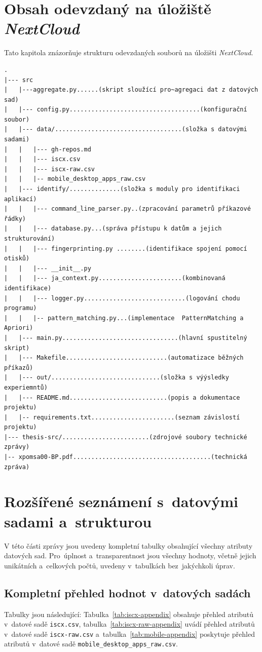 \chapter{Obsah odevzdaný na úložiště \textit{NextCloud}}
\label{chap:appendix-structure}
Tato kapitola znázorňuje strukturu odevzdaných souborů na úložišti \textit{NextCloud}.
\begin{verbatim}
.
|--- src
|   |---aggregate.py......(skript sloužící pro~agregaci dat z datových sad)
|   |--- config.py....................................(konfigurační soubor)
|   |--- data/...................................(složka s datovými sadami)
|   |   |--- gh-repos.md
|   |   |--- iscx.csv
|   |   |--- iscx-raw.csv
|   |   |-- mobile_desktop_apps_raw.csv
|   |--- identify/..............(složka s moduly pro identifikaci aplikací)
|   |   |--- command_line_parser.py..(zpracování parametrů příkazové řádky)
|   |   |--- database.py...(správa přístupu k datům a jejich strukturování)
|   |   |--- fingerprinting.py ........(identifikace spojení pomocí otisků)
|   |   |--- __init__.py
|   |   |--- ja_context.py.......................(kombinovaná identifikace)
|   |   |--- logger.py............................(logování chodu programu)
|   |   |-- pattern_matching.py...(implementace  PatternMatching a Apriori)
|   |--- main.py................................(hlavní spustitelný skript)
|   |--- Makefile............................(automatizace běžných příkazů)
|   |--- out/..............................(složka s výýsledky experiemntů)
|   |--- README.md...........................(popis a dokumentace projektu)
|   |-- requirements.txt.......................(seznam závislostí projektu)
|--- thesis-src/........................(zdrojové soubory technické zprávy)
|-- xpomsa00-BP.pdf......................................(technická zpráva)
\end{verbatim}

\chapter{Rozšířené seznámení s~datovými sadami a~strukturou}
\label{chp:appendix-ds}
V této části zprávy jsou uvedeny kompletní tabulky obsahující všechny atributy datových sad. Pro~úplnost a~transparentnost jsou všechny hodnoty, včetně jejich unikátních a~celkových počtů, uvedeny v~tabulkách bez~jakýchkoli úprav.

\section{Kompletní přehled hodnot v~datových sadách}
Tabulky jsou následující: Tabulka~\ref{tab:iscx-appendix} obsahuje přehled atributů v~datové sadě \texttt{iscx.csv}, tabulka~\ref{tab:iscx-raw-appendix} uvádí přehled atributů v~datové sadě \texttt{iscx-raw.csv} a~tabulka~\ref{tab:mobile-appendix} poskytuje přehled atributů v~datové sadě \texttt{mobile\_desktop\_apps\_raw.csv}.
